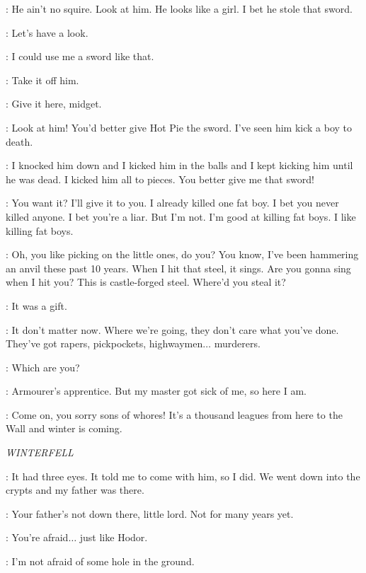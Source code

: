 \HOTPIE: He ain't no squire. Look at him. He looks like a girl. I bet he stole that sword. 

\LOMMY: Let's have a look. 

\HOTPIE: I could use me a sword like that. 

\LOMMY: Take it off him. 

\HOTPIE: Give it here, midget. 

\LOMMY: Look at him! You'd better give Hot Pie the sword. I've seen him kick a boy to death. 

\HOTPIE: I knocked him down and I kicked him in the balls and I kept kicking him until he was dead. I kicked him all to pieces. You better give me that sword! 

\ARYA: You want it? I'll give it to you. I already killed one fat boy. I bet you never killed anyone. I bet you're a liar. But I'm not. I'm good at killing fat boys. I like killing fat boys. 

\GENDRY: Oh, you like picking on the little ones, do you? You know, I've been hammering an anvil these past 10 years. When I hit that steel, it sings. Are you gonna sing when I hit you?  This is castle-forged steel. Where'd you steal it? 

\ARYA: It was a gift. 

\GENDRY: It don't matter now. Where we're going, they don't care what you've done. They've got rapers, pickpockets, highwaymen$\ldots$ murderers. 

\ARYA: Which are you? 

\GENDRY: Armourer's apprentice. But my master got sick of me, so here I am. 

\YOREN: Come on, you sorry sons of whores! It's a thousand leagues from here to the Wall and winter is coming.


\scene

\textit{WINTERFELL} 


\BRAN: It had three eyes. It told me to come with him, so I did. We went down into the crypts and my father was there. 

\OSHA: Your father's not down there, little lord. Not for many years yet. 

\BRAN: You're afraid$\ldots$ just like Hodor. 

\OSHA: I'm not afraid of some hole in the ground. 

